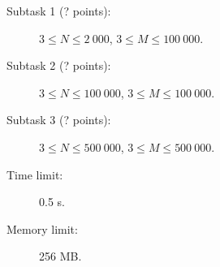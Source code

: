 \documentclass{boi2014}
\begin{document}
    \Scoring

    \begin{description}
        \item[Subtask 1 (? points):] $3 \le N \le 2\ 000$, $3 \le M \le 100\ 000$.
        \item[Subtask 2 (? points):] $3 \le N \le 100\ 000$, $3 \le M \le 100\ 000$.
        \item[Subtask 3 (? points):] $3 \le N \le 500\ 000$, $3 \le M \le 500\ 000$.
    \end{description}

    \Constraints

    \begin{description}
        \item[Time limit:] 0.5 s.
        \item[Memory limit:] 256 MB.
    \end{description}
\end{document}
